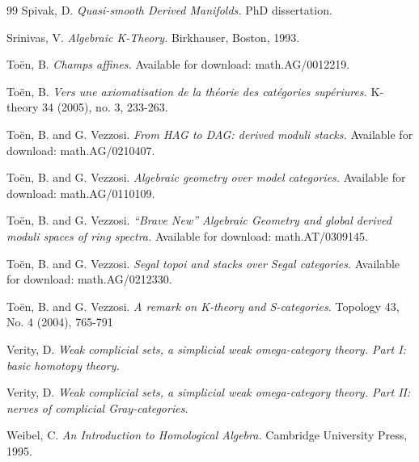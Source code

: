 \documentclass{article}
\theoremstyle{definition}
\begin{document}
\begin{thebibliography}{99}
 Spivak, D. {\it Quasi-smooth Derived Manifolds.} PhD dissertation.

 Srinivas, V. {\it Algebraic K-Theory.} Birkhauser, Boston, 1993.

 To\"{e}n, B. {\it Champs affines.} Available for
download: math.AG/0012219.

 To\"{e}n, B. {\it Vers une axiomatisation de la th\'{e}orie des cat\'{e}gories sup\'{e}riures.} K-theory 34 (2005), no. 3, 233-263.

 To\"{e}n, B. and G. Vezzosi. {\it From HAG to DAG:
derived moduli stacks.} Available for download: math.AG/0210407.

 To\"{e}n, B. and G. Vezzosi. {\it Algebraic
geometry over model categories.} Available for download:
math.AG/0110109.

 To\"{e}n, B. and G. Vezzosi. {\it ``Brave New''
Algebraic Geometry and global derived moduli spaces of ring
spectra.} Available for download: math.AT/0309145.

 To\"{e}n, B. and G. Vezzosi. {\it Segal topoi and
stacks over Segal categories.} Available for download:
math.AG/0212330.

 To\"{e}n, B. and G. Vezzosi. {\it A remark on K-theory and S-categories.} Topology 43, No. 4 (2004), 765-791


 Verity, D. {\it Weak complicial sets, a simplicial weak omega-category
theory. Part I: basic homotopy theory.} 

 Verity, D. {\it Weak complicial sets, a simplicial weak omega-category
theory. Part II: nerves of complicial Gray-categories.}

 Weibel, C. {\it An Introduction to Homological Algebra.} Cambridge University Press, 1995.

\end{thebibliography}
\end{document}
